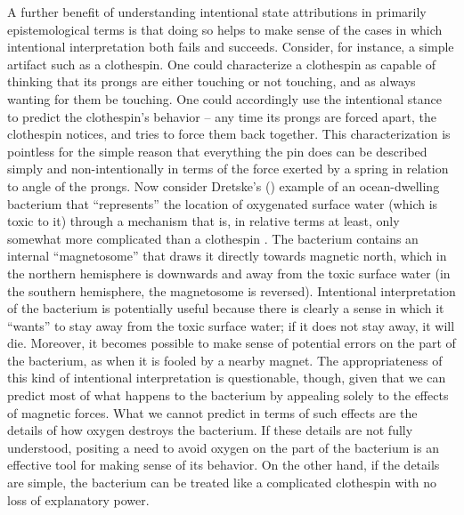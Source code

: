 A further benefit of understanding intentional state attributions in primarily epistemological terms is that doing so helps to make sense of the cases in which intentional interpretation both fails and succeeds. Consider, for instance, a simple artifact such as a clothespin. One could characterize a clothespin as capable of thinking that its prongs are either touching or not touching, and as always wanting for them be touching. One could accordingly use the intentional stance to predict the clothespin's behavior -- any time its prongs are forced apart, the clothespin notices, and tries to force them back together. This characterization is pointless for the simple reason that everything the pin does can be described simply and non-intentionally in terms of the force exerted by a spring in relation to angle of the prongs. Now consider Dretske's (\citeyear{Dretske:1986}) example of an ocean-dwelling bacterium that ``represents'' the location of oxygenated surface water (which is toxic to it) through a mechanism that is, in relative terms at least, only somewhat more complicated than a clothespin \citep[cf.][pp. 290-91]{Millikan:1989}. The bacterium contains an internal ``magnetosome'' that draws it directly towards magnetic north, which in the northern hemisphere is downwards and away from the toxic surface water (in the southern hemisphere, the magnetosome is reversed). Intentional interpretation of the bacterium is potentially useful because there is clearly a sense in which it ``wants'' to stay away from the toxic surface water; if it does not stay away, it will die. Moreover, it becomes possible to make sense of potential errors on the part of the bacterium, as when it is fooled by a nearby magnet. The appropriateness of this kind of intentional interpretation is questionable, though, given that we can predict most of what happens to the bacterium by appealing solely to the effects of magnetic forces. What we cannot predict in terms of such effects are the details of how oxygen destroys the bacterium. If these details are not fully understood, positing a need to avoid oxygen on the part of the bacterium is an effective tool for making sense of its behavior. On the other hand, if the details are simple, the bacterium can be treated like a complicated clothespin with no loss of explanatory power. 

